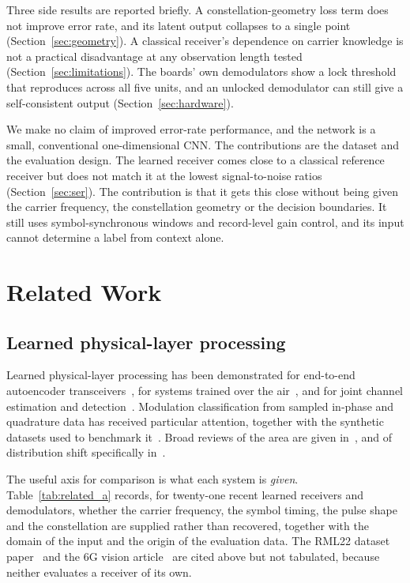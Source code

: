 \documentclass{ieeeaccess}
\begin{document}
Three side results are reported briefly. A constellation-geometry loss term
does not improve error rate, and its latent output collapses to a single point
(Section~\ref{sec:geometry}). A classical receiver's dependence on carrier
knowledge is not a practical disadvantage at any observation length tested
(Section~\ref{sec:limitations}). The boards' own demodulators show a lock
threshold that reproduces across all five units, and an unlocked demodulator
can still give a self-consistent output (Section~\ref{sec:hardware}).

We make no claim of improved error-rate performance, and the network is a
small, conventional one-dimensional CNN. The contributions are the dataset and
the evaluation design. The learned receiver comes
close to a classical reference receiver but does not match it at the lowest
signal-to-noise ratios (Section~\ref{sec:ser}). The contribution is that it gets
this close without being given the carrier frequency, the constellation
geometry or the decision boundaries. It still uses symbol-synchronous windows
and record-level gain control, and its input cannot determine a label from
context alone.

\section{Related Work}
\label{sec:related}

\subsection{Learned physical-layer processing}
Learned physical-layer processing has been demonstrated for end-to-end
autoencoder transceivers~\cite{oshea2017intro}, for systems trained over the
air~\cite{dorner2018ota}, and for joint channel estimation and
detection~\cite{ye2018power}. Modulation classification from sampled in-phase
and quadrature data has received particular attention, together with the
synthetic datasets used to benchmark it~\cite{satyanarayan2023RML}. Broad
reviews of the area are given in~\cite{hoydis2021nativeAirInterface,
akroutMLPtoGPT, wangDlphysicalLayer}, and of distribution shift specifically
in~\cite{akrout2023domaingeneralization}.

The useful axis for comparison is what each system is \emph{given}.
Table~\ref{tab:related_a} records, for twenty-one recent learned receivers and
demodulators, whether the carrier frequency, the symbol timing, the pulse shape
and the constellation are supplied rather than recovered, together with the
domain of the input and the origin of the evaluation data. The RML22 dataset
paper~\cite{satyanarayan2023RML} and the 6G vision
article~\cite{hoydis2021nativeAirInterface} are cited above but not tabulated,
because neither evaluates a receiver of its own.
\end{document}

